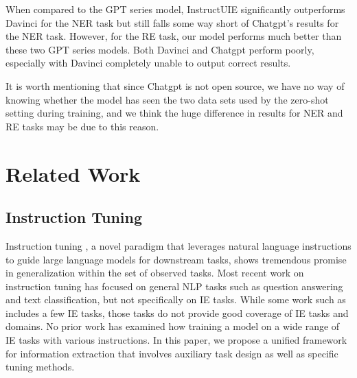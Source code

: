 \documentclass[11pt]{article}
\begin{document}
When compared to the GPT series model, InstructUIE significantly outperforms Davinci for the NER task but still falls some way short of Chatgpt's results for the NER task. However, for the RE task, our model performs much better than these two GPT series models. Both Davinci and Chatgpt perform poorly, especially with Davinci completely unable to output correct results.

It is worth mentioning that since Chatgpt is not open source, we have no way of knowing whether the model has seen the two data sets used by the zero-shot setting during training, and we think the huge difference in results for NER and RE tasks may be due to this reason.




















\section{Related Work}

\subsection{Instruction Tuning}
Instruction tuning \cite{mishra-etal-2022-cross, wang-etal-2022-super, Longpre2023TheFC}, a novel paradigm that leverages natural language instructions to guide large language models for downstream tasks, shows tremendous promise in generalization within the set of observed tasks.
Most recent work \cite{wang-etal-2022-super,Longpre2023TheFC} on instruction tuning has focused on general NLP tasks such as question answering and text classification, but not specifically on IE tasks.
While some work such as \cite{Wang2022InstructionNERAM, parmar-etal-2022-boxbart} includes a few IE tasks, those tasks do not provide good coverage of IE tasks and domains. 
No prior work has examined how training a model on a wide range of IE tasks with various instructions.
In this paper, we propose a unified framework for information extraction that involves auxiliary task design as well as specific tuning methods.
\end{document}
